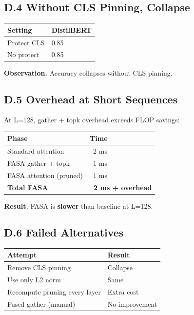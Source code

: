 \subsection{D.4 Without CLS Pinning, Collapse}

\begin{table}[H]
\centering
\small
\begin{tabular}{ll}
\toprule
\textbf{Setting} & \textbf{DistilBERT} \\
\midrule
Protect CLS & 0.85 \\
No protect & 0.85 \\
\bottomrule
\end{tabular}
\end{table}

\textbf{Observation.} Accuracy collapses without CLS pinning.

\subsection{D.5 Overhead at Short Sequences}

At L=128, gather + topk overhead exceeds FLOP savings:

\begin{table}[H]
\centering
\small
\begin{tabular}{ll}
\toprule
\textbf{Phase} & \textbf{Time} \\
\midrule
Standard attention & ~2 ms \\
FASA gather + topk & ~1 ms \\
FASA attention (pruned) & ~1 ms \\
\textbf{Total FASA} & \textbf{~2 ms + overhead} \\
\bottomrule
\end{tabular}
\end{table}

\textbf{Result.} FASA is \textbf{slower} than baseline at L=128.

\subsection{D.6 Failed Alternatives}

\begin{table}[H]
\centering
\small
\begin{tabular}{ll}
\toprule
\textbf{Attempt} & \textbf{Result} \\
\midrule
Remove CLS pinning & Collapse \\
Use only L2 norm & Same \\
Recompute pruning every layer & Extra cost \\
Fused gather (manual) & No improvement \\
\bottomrule
\end{tabular}
\end{table}

